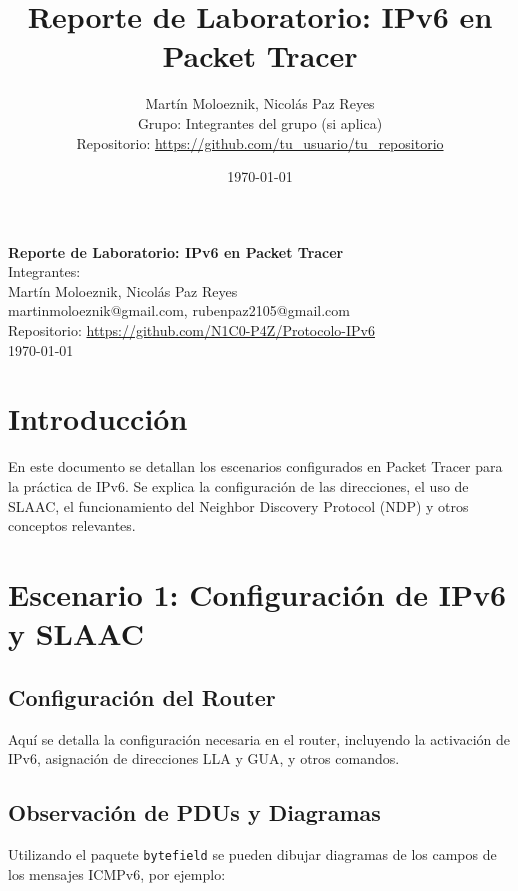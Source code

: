 \documentclass[a4paper,12pt]{article}
\title{Reporte de Laboratorio: IPv6 en Packet Tracer}
\author{Martín Moloeznik, Nicolás Paz Reyes\\[0.5em]
Grupo: Integrantes del grupo (si aplica)\\[0.5em]
Repositorio: \url{https://github.com/tu_usuario/tu_repositorio}}
\date{\today}
\begin{document}
\begin{titlepage}
  \centering
  \vspace*{2cm}
  {\Large \textbf{Reporte de Laboratorio: IPv6 en Packet Tracer}}\\[1.5cm]
  
  {\large Integrantes:}\\
   \bigskip
  {\large Martín Moloeznik, Nicolás Paz Reyes} \\[0.5cm]
  {\large {martinmoloeznik@gmail.com}, {rubenpaz2105@gmail.com}} \\[0.5cm]
  \bigskip
  {\large Repositorio: \url{https://github.com/N1C0-P4Z/Protocolo-IPv6}}\\[1cm]
  
  \vfill
  {\large \today}
\end{titlepage}

\tableofcontents
\newpage

\section{Introducción}
En este documento se detallan los escenarios configurados en Packet Tracer para la práctica de IPv6. Se explica la configuración de las direcciones, el uso de SLAAC, el funcionamiento del Neighbor Discovery Protocol (NDP) y otros conceptos relevantes.

\section{Escenario 1: Configuración de IPv6 y SLAAC}
\subsection{Configuración del Router}
Aquí se detalla la configuración necesaria en el router, incluyendo la activación de IPv6, asignación de direcciones LLA y GUA, y otros comandos.

\subsection{Observación de PDUs y Diagramas}
Utilizando el paquete \texttt{bytefield} se pueden dibujar diagramas de los campos de los mensajes ICMPv6, por ejemplo: \\
\end{document}
